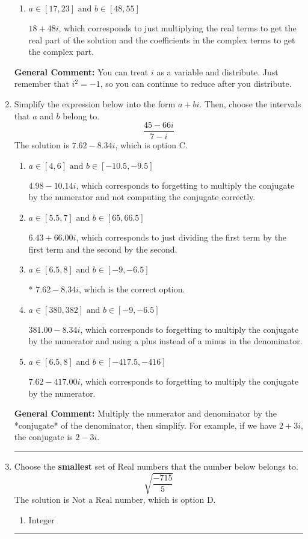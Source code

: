 \documentclass{extbook}[14pt]
\newcommand{\litem}[1]{\item #1

\rule{\textwidth}{0.4pt}}
\begin{document}
\begin{enumerate}
{\begin{enumerate}[label=\Alph*.]
 $66 - 60 i$, which corresponds to adding a minus sign in the first term.
\item \( a \in [17, 23] \text{ and } b \in [48, 55] \)

 $18 + 48 i$, which corresponds to just multiplying the real terms to get the real part of the solution and the coefficients in the complex terms to get the complex part.
\end{enumerate}

\textbf{General Comment:} You can treat $i$ as a variable and distribute. Just remember that $i^2=-1$, so you can continue to reduce after you distribute.
}
\litem{
Simplify the expression below into the form $a+bi$. Then, choose the intervals that $a$ and $b$ belong to.
\[ \frac{45 - 66 i}{7 - i} \]The solution is \( 7.62  - 8.34 i \), which is option C.\begin{enumerate}[label=\Alph*.]
\item \( a \in [4, 6] \text{ and } b \in [-10.5, -9.5] \)

 $4.98  - 10.14 i$, which corresponds to forgetting to multiply the conjugate by the numerator and not computing the conjugate correctly.
\item \( a \in [5.5, 7] \text{ and } b \in [65, 66.5] \)

 $6.43  + 66.00 i$, which corresponds to just dividing the first term by the first term and the second by the second.
\item \( a \in [6.5, 8] \text{ and } b \in [-9, -6.5] \)

* $7.62  - 8.34 i$, which is the correct option.
\item \( a \in [380, 382] \text{ and } b \in [-9, -6.5] \)

 $381.00  - 8.34 i$, which corresponds to forgetting to multiply the conjugate by the numerator and using a plus instead of a minus in the denominator.
\item \( a \in [6.5, 8] \text{ and } b \in [-417.5, -416] \)

 $7.62  - 417.00 i$, which corresponds to forgetting to multiply the conjugate by the numerator.
\end{enumerate}

\textbf{General Comment:} Multiply the numerator and denominator by the *conjugate* of the denominator, then simplify. For example, if we have $2+3i$, the conjugate is $2-3i$.
}
\litem{
Choose the \textbf{smallest} set of Real numbers that the number below belongs to.
\[ \sqrt{\frac{-715}{5}} \]The solution is \( \text{Not a Real number} \), which is option D.\begin{enumerate}[label=\Alph*.]
\item \( \text{Integer} \)


\end{enumerate}}
\end{enumerate}
\end{document}
